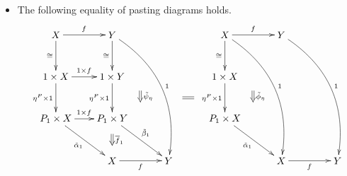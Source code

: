 \begin{Defi}
\begin{itemize}
\[                    {\ar_{\tilde{\alpha}_n} "b11" ; "b02"};
                    {\ar@{=>}^{\overline{f}_n} (50,-80.5) ; (50,-84.5)};
                    {\ar@{=>}^{1 \times \prod\overline{f}_{k_i}} (37.5,-60.5) ; (37.5,-64.5)};
                    {\ar@{=>}^{\tilde{\phi}_{k_1,\ldots,k_n}} (9,-72) ; (9,-76)};
                    {\ar@{=} (37.5,-45.5) ; (37.5,-49.5)};
                \endxy
            \]
            \item The following equality of pasting diagrams holds.
                \[
                    \xy
                        (0,0)*+{X}="00";
                        (20,0)*+{Y}="10";
                        (0,-15)*+{1 \times X}="01";
                        (20,-15)*+{1 \times Y}="11";
                        (0,-30)*+{P_1 \times X}="02";
                        (20,-30)*+{P_1 \times Y}="12";
                        (20,-45)*+{X}="r02";
                        (40,-45)*+{Y}="r12";
                        {\ar^{f} "00" ; "10"};
                        {\ar@/^2pc/^{1} "10" ; "r12"};
                        {\ar_{\cong} "00" ; "01"};
                        {\ar_{\eta^P \times 1} "01" ; "02"};
                        {\ar_{\tilde{\alpha}_1} "02" ; "r02"};
                        {\ar^{1 \times f} "01" ; "11"};
                        {\ar^{1 \times f} "02" ; "12"};
                        {\ar^{\tilde{\beta}_1} "12" ; "r12"};
                        {\ar_{\cong} "10" ; "11"};
                        {\ar_{\eta^P \times 1} "11" ; "12"};
                        {\ar_{f} "r02" ; "r12"};
                        {\ar@{=>}^{\overline{f}_1} (20,-35.5) ; (20,-39.5)};
                        {\ar@{=>}^{\tilde{\psi}_{\eta}} (30,-20) ; (30,-24)};
                        (60,0)*+{X}="x00";
                        (80,0)*+{Y}="x10";
                        (60,-15)*+{1 \times X}="x01";
                        (60,-30)*+{P_1 \times X}="x02";
                        (80,-45)*+{X}="xr02";
                        (100,-45)*+{Y}="xr12";
                        {\ar^{f} "x00" ; "x10"};
                        {\ar@/^2pc/^{1} "x10" ; "xr12"};
                        {\ar_{\cong} "x00" ; "x01"};
                        {\ar_{\eta^P \times 1} "x01" ; "x02"};
                        {\ar_{\tilde{\alpha}_1} "x02" ; "xr02"};
                        {\ar_{f} "xr02" ; "xr12"};
                        {\ar@/^2pc/^{1} "x00" ; "xr02"};
                        {\ar@{=>}^{\tilde{\phi}_\eta} (70,-20) ; (70,-24)};
                        {\ar@{=} (45,-22.5) ; (49,-22.5)};
                    \endxy
                \]
    \end{itemize}
\end{Defi}

